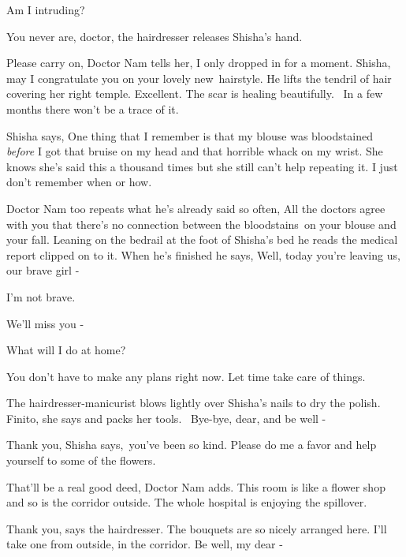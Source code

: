 \documentclass[letterpaper]{article}
\begin{document}
{\textquotedbl}Am I intruding?{\textquotedbl} 

{\textquotedbl}You never are, doctor,{\textquotedbl} the hairdresser releases Shisha's hand. 

{\textquotedbl}Please carry on,{\textquotedbl} Doctor Nam tells her, {\textquotedbl}I only dropped in for a moment.
Shisha, may I congratulate you on your lovely new~hairstyle.{\textquotedbl} He lifts the tendril of hair covering her
right temple. {\textquotedbl}Excellent. The scar is healing beautifully. ~In a few months there won't be a trace of
it.{\textquotedbl} 

Shisha says, {\textquotedbl}One thing that I remember is that my blouse was bloodstained \textit{before} I got that
bruise on my head and that horrible whack on my wrist.{\textquotedbl} She knows she's said this a thousand times but
she still can't help repeating it. {\textquotedbl}I just don't remember when or how.{\textquotedbl} 

Doctor Nam too repeats what he's already said so often, {\textquotedbl}All the doctors agree with you that there's no
connection between the bloodstains~on your blouse and your fall.{\textquotedbl} Leaning on the bedrail at the foot of
Shisha's bed he reads the medical report clipped on to it. When he's finished he says, {\textquotedbl}Well, today
you're leaving us, our brave girl -{\textquotedbl} 

{\textquotedbl}I'm not brave.{\textquotedbl} 

{\textquotedbl}We'll miss you -{\textquotedbl} 

{\textquotedbl}What will I do at home?{\textquotedbl} 

{\textquotedbl}You don't have to make any plans right now. Let time take care of things.{\textquotedbl} 

The hairdresser-manicurist blows lightly over Shisha's nails to dry the polish. {\textquotedbl}Finito,{\textquotedbl}
she says and packs her tools. ~{\textquotedbl}Bye-bye, dear, and be well -{\textquotedbl} ~

{\textquotedbl}Thank you,{\textquotedbl} Shisha says,~{\textquotedbl}you've been so kind. Please do me a favor and help
yourself to some of the flowers.{\textquotedbl} 

{\textquotedbl}That'll be a real good deed,{\textquotedbl} Doctor Nam adds. {\textquotedbl}This room is like a flower
shop and so is the corridor outside. The whole hospital is enjoying the spillover.{\textquotedbl}

{\textquotedbl}Thank you,{\textquotedbl} says the hairdresser. {\textquotedbl}The bouquets are so nicely arranged here.
I'll take one from outside, in the corridor. Be well, my dear -{\textquotedbl} 
\end{document}
